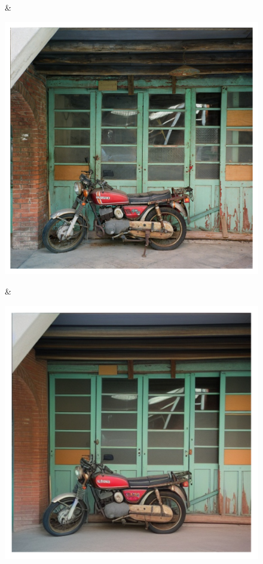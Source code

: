 \documentclass[letterpaper]{article} %
\begin{document}
\begin{figure}
\begin{tabular}
\begin{minipage}{\linewidth}
    \end{minipage} &
    \begin{minipage}{\linewidth}
        \includegraphics[width=\linewidth]{original_compare/65.pdf}
    \end{minipage} &
    \begin{minipage}{\linewidth}
        \includegraphics[width=\linewidth]{Ours_compare/65.pdf}

\end{minipage}
\end{tabular}
\end{figure}
\end{document}

